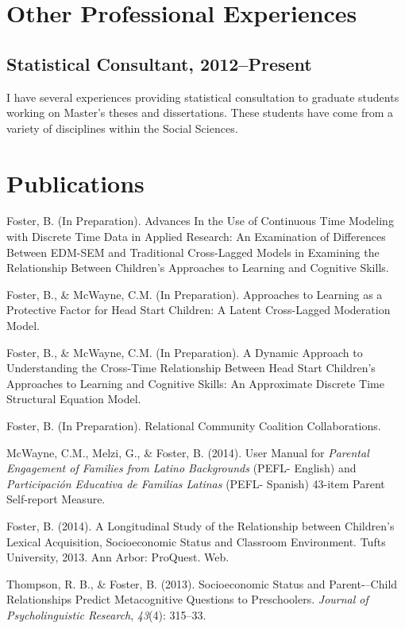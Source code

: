 \documentclass[letterpaper]{article}
\renewenvironment{itemize}{
  \begin{list}{}{
    \setlength{\leftmargin}{1.5em}
  }
}{
  \end{list}
}
\begin{document}
\section*{Other Professional Experiences}

\subsection*{Statistical Consultant, 2012--Present}
\begin{itemize}
\item I have several experiences providing statistical consultation to graduate students working on Master's theses and dissertations. These students have come from a variety of disciplines within the Social Sciences. 
\end{itemize} 

\section*{Publications}

\begin{itemize}

\item Foster, B. (In Preparation). Advances In the Use of Continuous Time Modeling with Discrete Time Data in Applied Research: An Examination of Differences Between EDM-SEM and Traditional Cross-Lagged Models in Examining the Relationship Between Children's Approaches to Learning and Cognitive Skills.

\item Foster, B., \& McWayne, C.M. (In Preparation). Approaches to Learning as a Protective Factor for Head Start Children: A Latent Cross-Lagged Moderation Model.

\item Foster, B., \& McWayne, C.M. (In Preparation). A Dynamic Approach to Understanding the Cross-Time Relationship Between Head Start Children's Approaches to Learning and Cognitive Skills: An Approximate Discrete Time Structural Equation Model. 

\item Foster, B. (In Preparation). Relational Community Coalition Collaborations. 

\item McWayne, C.M., Melzi, G., \& Foster, B. (2014). User Manual for {\it Parental Engagement of Families from Latino
Backgrounds} (PEFL- English) and {\it Participación Educativa de
Familias Latinas} (PEFL- Spanish) 43-item Parent Self-report Measure.

\item Foster, B. (2014). A Longitudinal Study of the Relationship between Children's Lexical Acquisition, Socioeconomic Status and Classroom Environment. Tufts University, 2013. Ann Arbor: ProQuest. Web.

Thompson, R. B., \& Foster, B. (2013). Socioeconomic Status and Parent-–Child Relationships Predict Metacognitive Questions to Preschoolers. {\it Journal of Psycholinguistic Research}, \emph{43}(4): 315--33.

\end{itemize}
\end{document}

